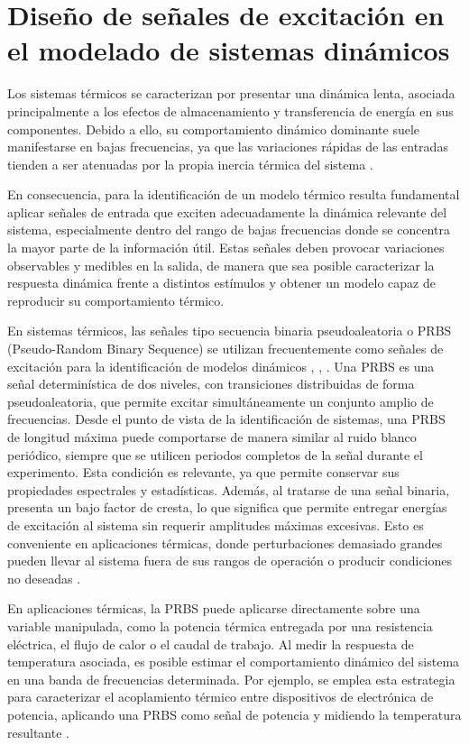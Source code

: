 \documentclass[11pt]{report}
\begin{document}
\section{Diseño de señales de excitación en el modelado de sistemas dinámicos}

Los sistemas térmicos se caracterizan por presentar una dinámica lenta, asociada principalmente a los efectos de almacenamiento y transferencia de energía en sus componentes. Debido a ello, su comportamiento dinámico dominante suele manifestarse en bajas frecuencias, ya que las variaciones rápidas de las entradas tienden a ser atenuadas por la propia inercia térmica del sistema \cite{KIM2016169}.

En consecuencia, para la identificación de un modelo térmico resulta fundamental aplicar señales de entrada que exciten adecuadamente la dinámica relevante del sistema, especialmente dentro del rango de bajas frecuencias donde se concentra la mayor parte de la información útil. Estas señales deben provocar variaciones observables y medibles en la salida, de manera que sea posible caracterizar la respuesta dinámica frente a distintos estímulos y obtener un modelo capaz de reproducir su comportamiento térmico.


En sistemas térmicos, las señales tipo secuencia binaria pseudoaleatoria o PRBS (Pseudo-Random Binary Sequence) se utilizan frecuentemente como señales de excitación para la identificación de modelos dinámicos \cite{aerospace12020074}, \cite{DRGONA2020190}, \cite{6842658}.
Una PRBS es una señal determinística de dos niveles, con transiciones distribuidas de forma pseudoaleatoria, que permite excitar simultáneamente un conjunto amplio de frecuencias. Desde el punto de vista de la identificación de sistemas, una PRBS de longitud máxima puede comportarse de manera similar al ruido blanco periódico, siempre que se utilicen periodos completos de la señal durante el experimento. Esta condición es relevante, ya que permite conservar sus propiedades espectrales y estadísticas. Además, al tratarse de una señal binaria, presenta un bajo factor de cresta, lo que significa que permite entregar energías de excitación al sistema sin requerir amplitudes máximas excesivas. Esto es conveniente en aplicaciones térmicas, donde perturbaciones demasiado grandes pueden llevar al sistema fuera de sus rangos de operación o producir condiciones no deseadas \cite{ljung1999system}.

En aplicaciones térmicas, la PRBS puede aplicarse directamente sobre una variable manipulada, como la potencia térmica entregada por una resistencia eléctrica, el flujo de calor o el caudal de trabajo. Al medir la respuesta de temperatura asociada, es posible estimar el comportamiento dinámico del sistema en una banda de frecuencias determinada. Por ejemplo, se emplea esta estrategia para caracterizar el acoplamiento térmico entre dispositivos de electrónica de potencia, aplicando una PRBS como señal de potencia y midiendo la temperatura resultante \cite{6842658}.
\end{document}
